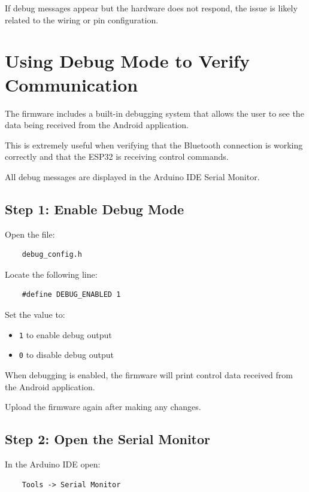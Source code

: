If debug messages appear but the hardware does not respond, the issue is likely related to the wiring or pin configuration.

\section{Using Debug Mode to Verify Communication}

The firmware includes a built-in debugging system that allows the user to see the data being received from the Android application.

This is extremely useful when verifying that the Bluetooth connection is working correctly and that the ESP32 is receiving control commands.

All debug messages are displayed in the Arduino IDE Serial Monitor.

\subsection{Step 1: Enable Debug Mode}

Open the file:

\begin{verbatim}
	debug_config.h
\end{verbatim}

Locate the following line:

\begin{verbatim}
	#define DEBUG_ENABLED 1
\end{verbatim}

Set the value to:

\begin{itemize}
	\item \texttt{1} to enable debug output
	\item \texttt{0} to disable debug output
\end{itemize}

When debugging is enabled, the firmware will print control data received from the Android application.

Upload the firmware again after making any changes.

\subsection{Step 2: Open the Serial Monitor}

In the Arduino IDE open:

\begin{verbatim}
	Tools -> Serial Monitor
\end{verbatim}

